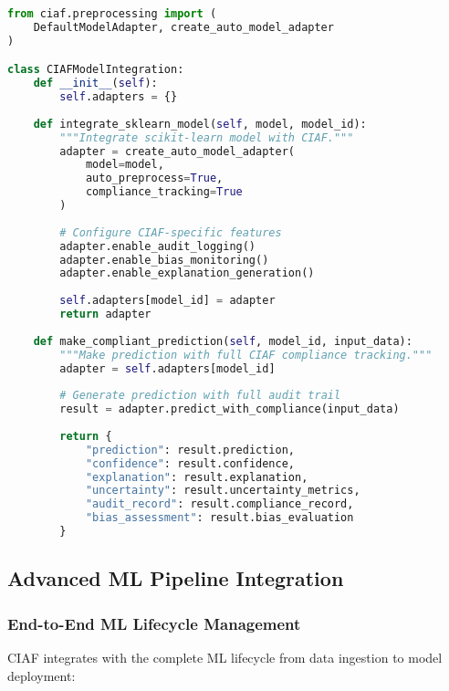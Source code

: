\documentclass[12pt,a4paper]{article}
\begin{document}
\begin{lstlisting}[language=Python, caption=Model Adapter Implementation]
from ciaf.preprocessing import (
    DefaultModelAdapter, create_auto_model_adapter
)

class CIAFModelIntegration:
    def __init__(self):
        self.adapters = {}
    
    def integrate_sklearn_model(self, model, model_id):
        """Integrate scikit-learn model with CIAF."""
        adapter = create_auto_model_adapter(
            model=model,
            auto_preprocess=True,
            compliance_tracking=True
        )
        
        # Configure CIAF-specific features
        adapter.enable_audit_logging()
        adapter.enable_bias_monitoring()
        adapter.enable_explanation_generation()
        
        self.adapters[model_id] = adapter
        return adapter
    
    def make_compliant_prediction(self, model_id, input_data):
        """Make prediction with full CIAF compliance tracking."""
        adapter = self.adapters[model_id]
        
        # Generate prediction with full audit trail
        result = adapter.predict_with_compliance(input_data)
        
        return {
            "prediction": result.prediction,
            "confidence": result.confidence,
            "explanation": result.explanation,
            "uncertainty": result.uncertainty_metrics,
            "audit_record": result.compliance_record,
            "bias_assessment": result.bias_evaluation
        }
\end{lstlisting}

\subsection{Advanced ML Pipeline Integration}

\subsubsection{End-to-End ML Lifecycle Management}

CIAF integrates with the complete ML lifecycle from data ingestion to model deployment:
\end{document}
